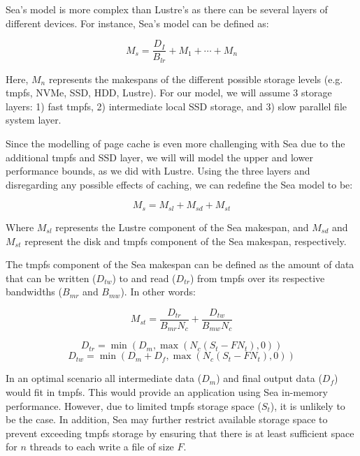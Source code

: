 \documentclass{report}
\begin{document}
    Sea's model is more complex than Lustre's as there can be several
    layers of different devices. For instance, Sea's model can be defined as:

    \begin{equation}\label{eq:sea}
        M_{s} = \frac{D_{I}}{B_{lr}} + M_{1} + \cdots + M_{n}
    \end{equation}

    Here, $M_{n}$ represents the makespans of the different possible storage levels
    (e.g. tmpfs, NVMe, SSD, HDD, Lustre). For our model, we will assume 3 storage layers:
    1) fast tmpfs, 2) intermediate local SSD storage, and 3) slow parallel file system layer.
    
    Since the modelling of page cache is even more challenging with Sea due to the additional tmpfs
    and SSD layer, we will will model the upper and lower performance bounds, as we did with Lustre.
    Using the three layers and disregarding any possible effects of caching, we can redefine the
    Sea model to be:

    \begin{equation}\label{eq:snc}
        M_{s} = M_{sl} + M_{sd} + M_{st}
    \end{equation}

    Where $M_{sl}$ represents the Lustre component of the Sea makespan, and
    $M_{sd}$ and $M_{st}$ represent the disk and tmpfs component of the Sea
    makespan, respectively.

    The tmpfs component of the Sea makespan can be defined as the amount of
    data that can be written ($D_{tw}$) to and read ($D_{tr}$) from tmpfs
    over its respective bandwidths ($B_{mr}$ and $B_{mw}$). In other words:

    \begin{equation}\label{eq:mst}
        M_{st} = \frac{D_{tr}}{B_{mr}N_{c}} + \frac{D_{tw}}{B_{mw}N_{c}}
    \end{equation}

    \begin{equation}\label{eq:dtr}
        D_{tr} = \min\left(D_{m}, \max{\left(N_{c}(S_{t} - FN_{t}), 0 \right)} \right)
    \end{equation}
    \begin{equation}\label{eq:dtw}
        D_{tw} = \min\left(D_{m} + D_{f}, \max{\left(N_{c}(S_{t} - FN_{t}), 0 \right)} \right)
    \end{equation}

    In an optimal scenario all intermediate data ($D_{m}$) and final output
    data ($D_{f}$) would fit in tmpfs. This would provide an application using
    Sea in-memory performance. However, due to limited tmpfs storage space ($S_{t}$), it is unlikely to be the case. In addition, Sea may further restrict
    available storage space to prevent exceeding tmpfs storage by ensuring that
    there is at least sufficient space for $n$ threads to each write a file of 
    size $F$.
\end{document}

